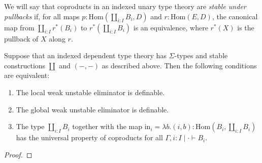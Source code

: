 \documentclass[reqno]{amsart}
\theoremstyle{definition}
\theoremstyle{remark}
\newcommand{\ob}{}
\newcommand{\fs}[1]{\mathrm{#1}}
\newcommand{\Hom}{\fs{Hom}}
\numberwithin{figure}{section}
\begin{document}
We will say that coproducts in an indexed unary type theory are \emph{stable under pullbacks} if, for all maps $p : \Hom(\coprod_{i : I} B_i, D)$ and $r : \Hom(E,D)$,
the canonical map from $\coprod_{i : I} r^*(B_i)$ to $r^*(\coprod_{i : I} B_i)$ is an equivalence, where $r^*(X)$ is the pullback of $X$ along $r$.




\begin{prop}
Suppose that an indexed dependent type theory has $\Sigma$-types and stable constructions $\coprod$ and $(-,-)$ as described above.
Then the following conditions are equivalent:
\begin{enumerate}
\item \label{it:coprod-local} The local weak unstable eliminator is definable.
\item \label{it:coprod-global} The global weak unstable eliminator is definable.
\item \label{it:coprod-uni} The type $\coprod_{i : I} B_i$ together with the map $\fs{in}_i = \lambda b.(i,b) : \Hom(B_i, \coprod_{i : I} B_i)$ has the universal property of coproducts for all $\Gamma, i : I \mid \cdot \vdash B_i \ob$.
\end{enumerate}
\end{prop}
\begin{proof}
\end{proof}
\end{document}
